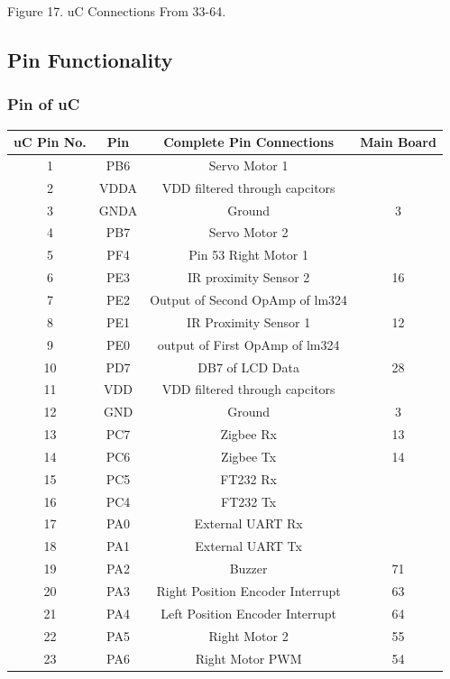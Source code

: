 \documentclass[a4paper,10pt,oneside]{article}
\begin{document}
{\begin{center}
		Figure 17. uC Connections From 33-64.\\
	\end{center}
	\subsection{\textbf{Pin Functionality}}
		\subsubsection{\textbf{Pin of uC}}
			\begin{longtable}{|c|c|c|c|}\hline
			 	uC Pin No.&Pin & 	Complete Pin Connections&Main Board\\ \hline
				1 &		PB6	&	Servo Motor 1&\\ \hline
				2 &		VDDA&	VDD filtered through capcitors&\\ \hline
				3 &		GNDA&	Ground&3\\ \hline
				4 &		PB7 &	Servo Motor 2&\\ \hline
				5 & 	PF4 &	Pin 53 Right Motor 1&\\ \hline
				6 &		PE3	&	IR proximity Sensor 2&16\\ \hline
				7 &		PE2 &	Output of Second OpAmp of lm324&\\ \hline
				8 &		PE1 &	IR Proximity Sensor 1 & 12\\ \hline
				9 &		PE0 &	output of First OpAmp of lm324&\\ \hline
				10 &	PD7 &	DB7 of LCD Data&28\\ \hline
				11 &	VDD &	VDD filtered through capcitors&\\ \hline
				12 &	GND	&	Ground&3\\ \hline
				13 &	PC7	&	Zigbee Rx&13\\ \hline
				14 &	PC6	&	Zigbee Tx&14\\ \hline
				15 & 	PC5	&	FT232 Rx&\\ \hline
				16 & 	PC4 &	FT232 Tx&\\ \hline 
				17 &	PA0 &	External UART Rx&\\ \hline
				18 &	PA1 &	External UART Tx&\\ \hline
				19 &	PA2 &	Buzzer&71\\ \hline
				20 &	PA3 &	Right Position Encoder Interrupt&63\\ \hline
				21 &	PA4	 &	Left Position Encoder Interrupt&64\\ \hline
				22 &	PA5 &	Right Motor 2&55\\ \hline
				23 &	PA6 &	Right Motor PWM&54\\ \hline

\end{longtable}}
\end{document}
